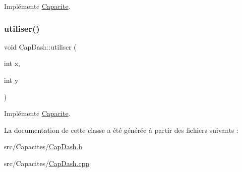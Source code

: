 Implémente \hyperlink{class_capacite_a7d4e86c20cd198960f25c0eb443148fe}{Capacite}.

\mbox{\label{class_cap_dash_ada59ecb62d2c18f6bb6b4acf28a2da93}} 
\subsubsection{\texorpdfstring{utiliser()}{utiliser()}}
{\footnotesize\ttfamily void Cap\+Dash\+::utiliser (\begin{DoxyParamCaption}\item[{int}]{x,  }\item[{int}]{y }\end{DoxyParamCaption})\hspace{0.3cm}{\ttfamily [virtual]}}



Implémente \hyperlink{class_capacite_a4d4f643987fcc2168567bf28a36ea418}{Capacite}.



La documentation de cette classe a été générée à partir des fichiers suivants \+:\begin{DoxyCompactItemize}
\item 
src/\+Capacites/\hyperlink{_cap_dash_8h}{Cap\+Dash.\+h}\item 
src/\+Capacites/\hyperlink{_cap_dash_8cpp}{Cap\+Dash.\+cpp}\end{DoxyCompactItemize}
